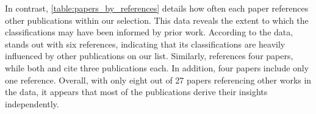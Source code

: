 In contrast, \autoref{table:papers_by_references} details how often each paper references other publications within our selection. This data reveals the extent to which the classifications may have been informed by prior work. According to the data, \cite{auer_sciqa_2023} stands out with six references, indicating that its classifications are heavily influenced by other publications on our list. Similarly, \cite{chernov_linguistically_2015} references four papers, while both \cite{karras_divide_2023} and \cite{taffa_hybrid-squad_2024} cite three publications each. In addition, four papers \cite{bolotova_non-factoid_2022,allam_question_2016,banerjee_dblp-quad_2023,usbeck_qald-10_2023} include only one reference. Overall, with only eight out of 27 papers referencing other works in the data, it appears that most of the publications derive their insights independently.
